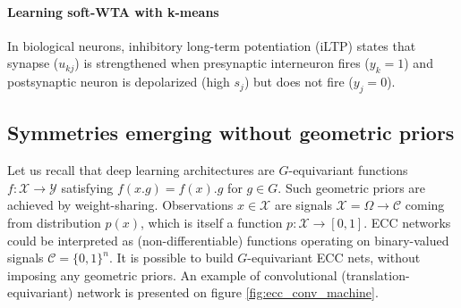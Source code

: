 \documentclass[12pt]{article}
\begin{document}
\paragraph{Learning soft-WTA with k-means}
In biological neurons, inhibitory long-term potentiation (iLTP) \cite{inhibitory_plasticity} states that synapse ($u_{kj}$) is strengthened when presynaptic interneuron fires ($y_k=1$) and postsynaptic neuron is depolarized (high $s_j$) but does not fire ($y_j=0$). 






\subsection{Symmetries emerging without geometric priors}

Let us recall that deep learning architectures are  $G$-equivariant functions $f:\mathcal{X}\rightarrow \mathcal{Y}$ satisfying $f(x.g)=f(x).g$ for $g\in G$. Such geometric priors are achieved by weight-sharing. Observations $x\in \mathcal{X}$ are signals $\mathcal{X}=\Omega \rightarrow \mathcal{C}$ coming from distribution $p(x)$, which is itself a function $p:\mathcal{X} \rightarrow [0,1]$.   
ECC networks could be interpreted as (non-differentiable) functions operating on binary-valued signals $\mathcal{C}=\{0,1\}^n$. It is possible to build $G$-equivariant ECC nets, without imposing any geometric priors. An example of convolutional (translation-equivariant) network is presented on figure \ref{fig:ecc_conv_machine}.
\end{document}
